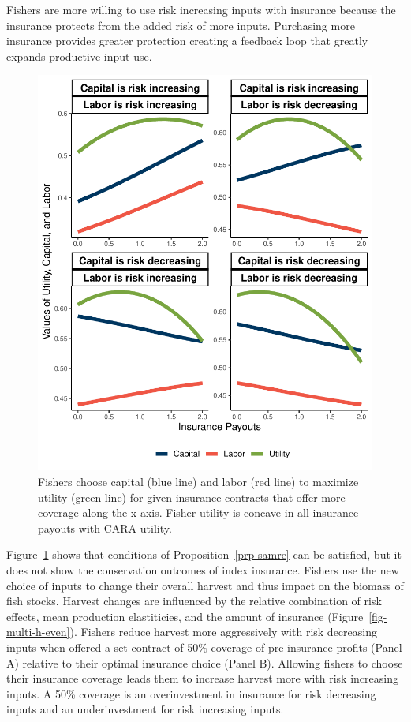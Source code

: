 \documentclass[
  letterpaper,
  DIV=11,
  numbers=noendperiod]{scrartcl}
\theoremstyle{plain}
\theoremstyle{plain}
\theoremstyle{remark}
\begin{document}
Fishers are more willing to use risk increasing inputs with insurance
because the insurance protects from the added risk of more inputs.
Purchasing more insurance provides greater protection creating a
feedback loop that greatly expands productive input use.

\begin{figure}

{\centering \includegraphics{ibi-behavior_files/figure-pdf/fig-ins-1.pdf}

}

\caption{\label{fig-ins}Fishers choose capital (blue line) and labor
(red line) to maximize utility (green line) for given insurance
contracts that offer more coverage along the x-axis. Fisher utility is
concave in all insurance payouts with CARA utility.}

\end{figure}

Figure~\ref{fig-ins} shows that conditions of
Proposition~\ref{prp-samre} can be satisfied, but it does not show the
conservation outcomes of index insurance. Fishers use the new choice of
inputs to change their overall harvest and thus impact on the biomass of
fish stocks. Harvest changes are influenced by the relative combination
of risk effects, mean production elastiticies, and the amount of
insurance (Figure~\ref{fig-multi-h-even}). Fishers reduce harvest more
aggressively with risk decreasing inputs when offered a set contract of
50\% coverage of pre-insurance profits (Panel A) relative to their
optimal insurance choice (Panel B). Allowing fishers to choose their
insurance coverage leads them to increase harvest more with risk
increasing inputs. A 50\% coverage is an overinvestment in insurance for
risk decreasing inputs and an underinvestment for risk increasing
inputs.
\end{document}

